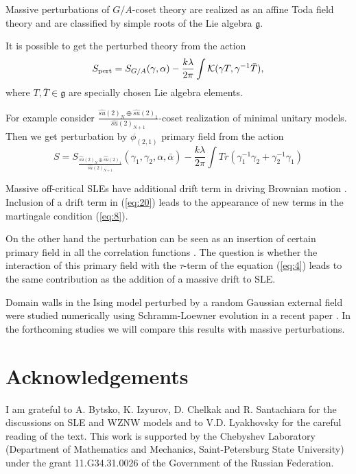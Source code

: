 \documentclass{jetpl}
\newcommand{\gf}{\mathfrak{g}}
\begin{document}
Massive perturbations of $G/A$-coset theory are realized as an affine Toda field theory and are classified by simple roots of the Lie algebra $\gf$. 

It is possible to get the perturbed theory from the action \cite{bakas1996lagrangian,hollowood1995massive,park1994deformed}
\begin{equation}
  S_{\text{pert}}=S_{G/A}(\gamma,\alpha)-\frac{k\lambda}{2\pi}\int {\cal K} (\gamma T, \gamma^{-1} \bar T),
\end{equation}
where $T,\bar T\in \gf$ are specially chosen Lie algebra elements. 

For example consider  $\frac{\hat{su}(2)_{N}\oplus \hat{su}(2)_{1}}{\hat{su}(2)_{N+1}}$-coset realization of minimal unitary models. Then we get perturbation by $\phi_{(2,1)}$ primary field from the action
\begin{equation}
  S=S_{\frac{\hat{su}(2)_{N}\oplus \hat{su}(2)_{1}}{\hat{su}(2)_{N+1}}} (\gamma_1,\gamma_2,\alpha,\bar \alpha) - \frac{k\lambda}{2\pi}\int Tr(\gamma_1^{-1} \gamma_2+\gamma_2^{-1}\gamma_1)
\end{equation}


Massive off-critical SLEs have additional drift term in driving Brownian motion \cite{makarov2010off}. Inclusion of a drift term in (\ref{eq:20}) leads to the  appearance of new terms in the martingale condition (\ref{eq:8}).

On the other hand the perturbation can be seen as an insertion of certain primary field in all the correlation functions \cite{hollowood1989rational}. The question is whether the interaction of this primary field with the $\tau$-term of the equation (\ref{eq:4}) leads to the same contribution as the addition of a massive drift to SLE.

Domain walls in the Ising model perturbed by a random Gaussian external field were studied numerically using Schramm-Loewner evolution in a recent paper \cite{stevenson2011domain}. In the forthcoming studies we will compare this results with massive perturbations.


\section*{Acknowledgements}
\label{sec:acknowledgements}
 I am grateful to A. Bytsko, K. Izyurov, D. Chelkak and R. Santachiara for the discussions on SLE and WZNW models and to V.D. Lyakhovsky for the careful reading of the text.  This work  is supported by
the Chebyshev Laboratory (Department of Mathematics and Mechanics,
Saint-Petersburg State University) under the grant 11.G34.31.0026
of the Government of the Russian Federation.
\end{document}
